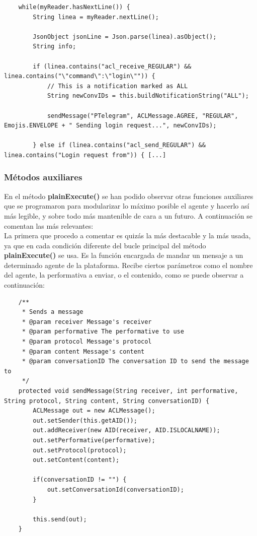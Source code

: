 \begin{lstlisting}
    while(myReader.hasNextLine()) {
        String linea = myReader.nextLine();
        
        JsonObject jsonLine = Json.parse(linea).asObject();
        String info;
        
        if (linea.contains("acl_receive_REGULAR") && linea.contains("\"command\":\"login\"")) {
            // This is a notification marked as ALL
            String newConvIDs = this.buildNotificationString("ALL");                
            
            sendMessage("PTelegram", ACLMessage.AGREE, "REGULAR", Emojis.ENVELOPE + " Sending login request...", newConvIDs);
            
        } else if (linea.contains("acl_send_REGULAR") && linea.contains("Login request from")) { [...]
\end{lstlisting}

\subsubsection{Métodos auxiliares}

En el método \textbf{plainExecute()} se han podido observar otras funciones auxiliares que se programaron para modularizar lo máximo posible el agente y hacerlo así más legible, y sobre todo más mantenible de cara a un futuro. A continuación se comentan las más relevantes:\\

La primera que procedo a comentar es quizás la más destacable y la más usada, ya que en cada condición diferente del bucle principal del método \textbf{plainExecute()} se usa. Es la función encargada de mandar un mensaje a un determinado agente de la plataforma. Recibe ciertos parámetros como el nombre del agente, la performativa a enviar, o el contenido, como se puede observar a continuación:\\

\begin{lstlisting}
    /**
     * Sends a message
     * @param receiver Message's receiver
     * @param performative The performative to use
     * @param protocol Message's protocol
     * @param content Message's content
     * @param conversationID The conversation ID to send the message to
     */
    protected void sendMessage(String receiver, int performative, String protocol, String content, String conversationID) {
        ACLMessage out = new ACLMessage();
        out.setSender(this.getAID());
        out.addReceiver(new AID(receiver, AID.ISLOCALNAME));
        out.setPerformative(performative);
        out.setProtocol(protocol);
        out.setContent(content);

        if(conversationID != "") {
            out.setConversationId(conversationID);
        }

        this.send(out);
    }
\end{lstlisting}

